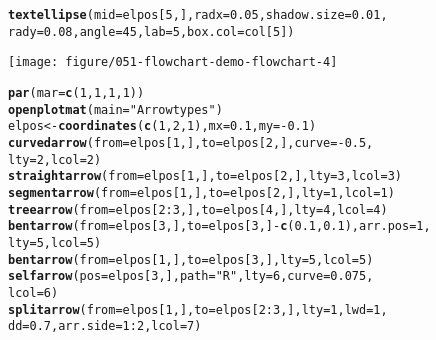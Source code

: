 \documentclass{article}\usepackage[]{graphicx}\usepackage[]{color}
\makeatletter
\def\maxwidth{ %
  \ifdim\Gin@nat@width>\linewidth
    \linewidth
  \else
    \Gin@nat@width
  \fi
}
\newcommand{\hlnum}[1]{\textcolor[rgb]{0.686,0.059,0.569}{#1}}%
\newcommand{\hlstr}[1]{\textcolor[rgb]{0.192,0.494,0.8}{#1}}%
\newcommand{\hlopt}[1]{\textcolor[rgb]{0,0,0}{#1}}%
\newcommand{\hlstd}[1]{\textcolor[rgb]{0.345,0.345,0.345}{#1}}%
\newcommand{\hlkwb}[1]{\textcolor[rgb]{0.69,0.353,0.396}{#1}}%
\newcommand{\hlkwc}[1]{\textcolor[rgb]{0.333,0.667,0.333}{#1}}%
\newcommand{\hlkwd}[1]{\textcolor[rgb]{0.737,0.353,0.396}{\textbf{#1}}}%
\newenvironment{kframe}{%
 \def\at@end@of@kframe{}%
 \ifinner\ifhmode%
  \def\at@end@of@kframe{\end{minipage}}%
  \begin{minipage}{\columnwidth}%
 \fi\fi%
 \def\FrameCommand##1{\hskip\@totalleftmargin \hskip-\fboxsep
 \colorbox{shadecolor}{##1}\hskip-\fboxsep
     \hskip-\linewidth \hskip-\@totalleftmargin \hskip\columnwidth}%
 \MakeFramed {\advance\hsize-\width
   \@totalleftmargin\z@ \linewidth\hsize
   \@setminipage}}%
 {\par\unskip\endMakeFramed%
 \at@end@of@kframe}
\newenvironment{knitrout}{}{} %
\makeatother
\begin{document}
\begin{knitrout}
\begin{kframe}
\begin{alltt}
\hlkwd{textellipse}\hlstd{(}\hlkwc{mid} \hlstd{= elpos[}\hlnum{5}\hlstd{, ],} \hlkwc{radx} \hlstd{=} \hlnum{0.05}\hlstd{,} \hlkwc{shadow.size} \hlstd{=} \hlnum{0.01}\hlstd{,}
    \hlkwc{rady} \hlstd{=} \hlnum{0.08}\hlstd{,} \hlkwc{angle} \hlstd{=} \hlnum{45}\hlstd{,} \hlkwc{lab} \hlstd{=} \hlnum{5}\hlstd{,} \hlkwc{box.col} \hlstd{= col[}\hlnum{5}\hlstd{])}
\end{alltt}
\end{kframe}
\texttt{[image: figure/051-flowchart-demo-flowchart-4]} 
\begin{kframe}\begin{alltt}
\hlkwd{par}\hlstd{(}\hlkwc{mar} \hlstd{=} \hlkwd{c}\hlstd{(}\hlnum{1}\hlstd{,} \hlnum{1}\hlstd{,} \hlnum{1}\hlstd{,} \hlnum{1}\hlstd{))}
\hlkwd{openplotmat}\hlstd{(}\hlkwc{main} \hlstd{=} \hlstr{"Arrowtypes"}\hlstd{)}
\hlstd{elpos} \hlkwb{<-} \hlkwd{coordinates}\hlstd{(}\hlkwd{c}\hlstd{(}\hlnum{1}\hlstd{,} \hlnum{2}\hlstd{,} \hlnum{1}\hlstd{),} \hlkwc{mx} \hlstd{=} \hlnum{0.1}\hlstd{,} \hlkwc{my} \hlstd{=} \hlopt{-}\hlnum{0.1}\hlstd{)}
\hlkwd{curvedarrow}\hlstd{(}\hlkwc{from} \hlstd{= elpos[}\hlnum{1}\hlstd{, ],} \hlkwc{to} \hlstd{= elpos[}\hlnum{2}\hlstd{, ],} \hlkwc{curve} \hlstd{=} \hlopt{-}\hlnum{0.5}\hlstd{,}
    \hlkwc{lty} \hlstd{=} \hlnum{2}\hlstd{,} \hlkwc{lcol} \hlstd{=} \hlnum{2}\hlstd{)}
\hlkwd{straightarrow}\hlstd{(}\hlkwc{from} \hlstd{= elpos[}\hlnum{1}\hlstd{, ],} \hlkwc{to} \hlstd{= elpos[}\hlnum{2}\hlstd{, ],} \hlkwc{lty} \hlstd{=} \hlnum{3}\hlstd{,} \hlkwc{lcol} \hlstd{=} \hlnum{3}\hlstd{)}
\hlkwd{segmentarrow}\hlstd{(}\hlkwc{from} \hlstd{= elpos[}\hlnum{1}\hlstd{, ],} \hlkwc{to} \hlstd{= elpos[}\hlnum{2}\hlstd{, ],} \hlkwc{lty} \hlstd{=} \hlnum{1}\hlstd{,} \hlkwc{lcol} \hlstd{=} \hlnum{1}\hlstd{)}
\hlkwd{treearrow}\hlstd{(}\hlkwc{from} \hlstd{= elpos[}\hlnum{2}\hlopt{:}\hlnum{3}\hlstd{, ],} \hlkwc{to} \hlstd{= elpos[}\hlnum{4}\hlstd{, ],} \hlkwc{lty} \hlstd{=} \hlnum{4}\hlstd{,} \hlkwc{lcol} \hlstd{=} \hlnum{4}\hlstd{)}
\hlkwd{bentarrow}\hlstd{(}\hlkwc{from} \hlstd{= elpos[}\hlnum{3}\hlstd{, ],} \hlkwc{to} \hlstd{= elpos[}\hlnum{3}\hlstd{, ]} \hlopt{-} \hlkwd{c}\hlstd{(}\hlnum{0.1}\hlstd{,} \hlnum{0.1}\hlstd{),} \hlkwc{arr.pos} \hlstd{=} \hlnum{1}\hlstd{,}
    \hlkwc{lty} \hlstd{=} \hlnum{5}\hlstd{,} \hlkwc{lcol} \hlstd{=} \hlnum{5}\hlstd{)}
\hlkwd{bentarrow}\hlstd{(}\hlkwc{from} \hlstd{= elpos[}\hlnum{1}\hlstd{, ],} \hlkwc{to} \hlstd{= elpos[}\hlnum{3}\hlstd{, ],} \hlkwc{lty} \hlstd{=} \hlnum{5}\hlstd{,} \hlkwc{lcol} \hlstd{=} \hlnum{5}\hlstd{)}
\hlkwd{selfarrow}\hlstd{(}\hlkwc{pos} \hlstd{= elpos[}\hlnum{3}\hlstd{, ],} \hlkwc{path} \hlstd{=} \hlstr{"R"}\hlstd{,} \hlkwc{lty} \hlstd{=} \hlnum{6}\hlstd{,} \hlkwc{curve} \hlstd{=} \hlnum{0.075}\hlstd{,}
    \hlkwc{lcol} \hlstd{=} \hlnum{6}\hlstd{)}
\hlkwd{splitarrow}\hlstd{(}\hlkwc{from} \hlstd{= elpos[}\hlnum{1}\hlstd{, ],} \hlkwc{to} \hlstd{= elpos[}\hlnum{2}\hlopt{:}\hlnum{3}\hlstd{, ],} \hlkwc{lty} \hlstd{=} \hlnum{1}\hlstd{,} \hlkwc{lwd} \hlstd{=} \hlnum{1}\hlstd{,}
    \hlkwc{dd} \hlstd{=} \hlnum{0.7}\hlstd{,} \hlkwc{arr.side} \hlstd{=} \hlnum{1}\hlopt{:}\hlnum{2}\hlstd{,} \hlkwc{lcol} \hlstd{=} \hlnum{7}\hlstd{)}


\end{alltt}
\end{kframe}
\end{knitrout}
\end{document}

